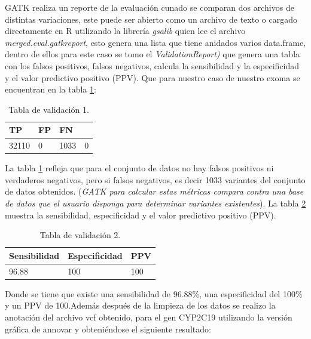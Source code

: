 GATK realiza un reporte de la evaluación cunado se comparan dos archivos de distintas variaciones, este puede ser abierto como un archivo de texto o cargado directamente en R utilizando la librería \textit{gsalib} quien lee el archivo \textit{merged.eval.gatkreport}, esto genera una lista que tiene anidados varios data.frame, dentro de ellos para este caso se tomo el \textit{ValidationReport)} que genera una tabla con los falsos positivos, falsos negativos, calcula la sensibilidad y la especificidad  y el valor predictivo positivo (PPV). Que para nuestro caso de nuestro exoma se encuentran en la tabla \ref{tabla:tabla3}:

\begin{table}[H]
	\begin{center}
		\begin{tabular}{|l|l|l|l|}
			\hline 
			\textbf{TP} & \textbf{FP} & \textbf{FN} & \text{TN} \\
			\hline 
			32110 & 0 & 1033 & 0 \\ \hline
		\end{tabular}
		\caption{Tabla de validación 1.}
		\label{tabla:tabla3}
	\end{center}
\end{table}

La tabla \ref{tabla:tabla3} refleja que para el conjunto de datos no hay falsos positivos ni verdaderos negativos, pero si falsos negativos, es decir 1033 variantes del conjunto de datos obtenidos. (\textit{GATK para calcular estas métricas compara contra una base de datos que el usuario disponga para determinar variantes existentes}).  La tabla \ref{tabla:tabla4} muestra la sensibilidad, especificidad y el valor predictivo positivo (PPV).

\begin{table}[H]
	\begin{center}
		\begin{tabular}{|l|l|l|}
			\hline 
			\textbf{Sensibilidad} & \textbf{Especificidad} & \textbf{PPV} \\
			\hline 
			96.88 & 100 & 100 \\ \hline
		\end{tabular}
		\caption{Tabla de validación 2.}
		\label{tabla:tabla4}
	\end{center}
\end{table}

Donde se tiene que existe una sensibilidad de 96.88\%, una especificidad del 100\% y un PPV de 100.Además después de la limpieza de los datos se realizo la anotación del archivo vcf obtenido, para el gen CYP2C19 utilizando la versión gráfica de annovar \cite{Yang2015} y obteniéndose el siguiente resultado: \\

